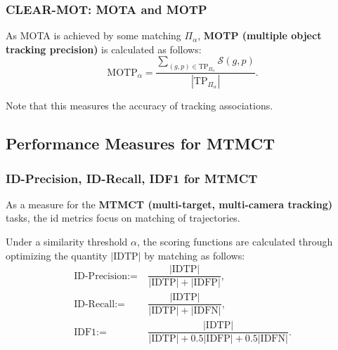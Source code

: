 \documentclass[slidestop, mathserif]{beamer}
\begin{document}
\begin{frame}
    \frametitle{CLEAR-MOT: MOTA and MOTP}

    As MOTA is achieved by some matching $\Pi_\alpha$, {\bf MOTP (multiple object tracking precision)}
    is calculated as follows:
    \[
        \text{MOTP}_\alpha =
            \dfrac{\sum_{(g,p)\in\text{TP}_{\Pi_\alpha}}\mathcal S(g,p)}{|\text{TP}_{\Pi_\alpha}|}.
    \]

    \quad 

    Note that this measures the accuracy of tracking associations.

\end{frame}

\subsection{Performance Measures for MTMCT}

\begin{frame}
    \frametitle{ID-Precision, ID-Recall, IDF1 for MTMCT}

    As a measure for the {\bf MTMCT (multi-target, multi-camera tracking)} tasks,
    the id metrics focus on matching of trajectories.

    \quad 

    Under a similarity threshold $\alpha$, the scoring functions are calculated through optimizing
    the quantity $|\text{IDTP}|$ by matching as follows:
    \begin{align*}
        \text{ID-Precision} := & ~ \dfrac{|\text{IDTP}|}{|\text{IDTP}| + |\text{IDFP}|}, \\
        \text{ID-Recall} := & ~ \dfrac{|\text{IDTP}|}{|\text{IDTP}| + |\text{IDFN}|}, \\
        \text{IDF1} := & 
            ~ \dfrac{|\text{IDTP}|}{|\text{IDTP}| + 0.5|\text{IDFP}| + 0.5|\text{IDFN}|}.
    \end{align*}

\end{frame}
\end{document}
